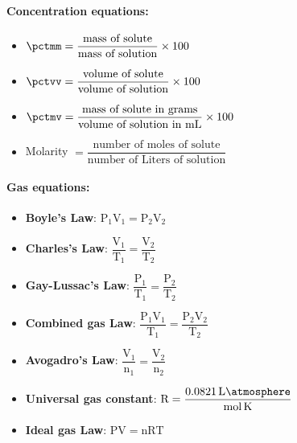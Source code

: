 \documentclass[9pt]{article}
\begin{document}
\begin{multicols}{2}
    \paragraph{\textsf{Concentration equations:}}

    \begin{itemize}
        \item  \( \si{\pctmm}  = \dfrac{\text{mass of solute}}{\text{mass of solution}} \times \num{100}  \)
        \item \(\si{\pctvv} = \dfrac{\text{volume of solute}}{\text{volume of solution}} \times \num{100} \)
        \item \(\si{\pctmv}= \dfrac{\text{mass of solute in grams}}{\text{volume of solution in mL}} \times \num{100} \)
        \item Molarity \(= \dfrac{\text{number of moles of solute}}{\text{number of Liters of solution}}\)
    \end{itemize}
    \vspace{0.5cm}

    \paragraph{\textsf{Gas equations:}}

    \begin{itemize}
        \item \textbf{Boyle's Law}:    \( \mathrm{P_1 V_1} = \mathrm{P_2 V_2}  \)
        \item \textbf{Charles's Law}: \(\dfrac{\mathrm{V_1}}{\mathrm{T_1}} = \mathrm{\dfrac{V_2}{T_2}}\)
        \item \textbf{Gay-Lussac's Law}: \(\mathrm{\dfrac{P_1}{T_1} = \dfrac{P_2}{T_2}} \)
        \item \textbf{Combined gas Law}: \(\mathrm{\dfrac{P_1 V_1}{T_1} = \dfrac{P_2 V_2}{T_2}} \)
        \item \textbf{Avogadro's Law}: \( \mathrm{\dfrac{V_1}{n_1} = \dfrac{V_2}{n_2}} \)
        \item \textbf{Universal gas constant}: \( \mathrm{R} = \dfrac{\SI{0.0821}{\liter \atmosphere}}{\si{\mole \kelvin}}  \)
        \item \textbf{Ideal gas Law}: \( \mathrm{PV = nRT} \)
    \end{itemize}


\end{multicols}
\end{document}
